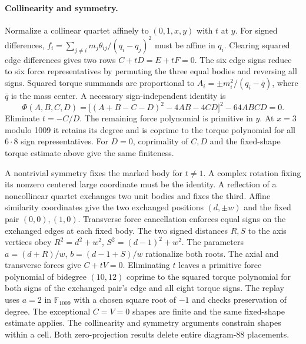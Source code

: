 \documentclass[11pt]{article}
\newcommand{\F}{\mathbb F}
\begin{document}
\paragraph{Collinearity and symmetry.}
Normalize a collinear quartet affinely to $(0,1,x,y)$ with $t$ at $y$. For signed differences, $f_i=\sum_{j\ne i}m_j\theta_{ij}/(q_i-q_j)^2$ must be affine in $q_i$. Clearing squared edge differences gives two rows $C+tD=E+tF=0$. The six edge signs reduce to six force representatives by permuting the three equal bodies and reversing all signs. Squared torque summands are proportional to $A_i=\pm m_i^2/(q_i-\bar q)$, where $\bar q$ is the mass center. A necessary sign-independent identity is
\[
 \Phi(A,B,C,D)=\big[(A+B-C-D)^2-4AB-4CD\big]^2-64ABCD=0.
\]
Eliminate $t=-C/D$. The remaining force polynomial is primitive in $y$. At $x=3$ modulo 1009 it retains its degree and is coprime to the torque polynomial for all $6\cdot8$ sign representatives. For $D=0$, coprimality of $C,D$ and the fixed-shape torque estimate above give the same finiteness.

A nontrivial symmetry fixes the marked body for $t\ne1$. A complex rotation fixing its nonzero centered large coordinate must be the identity. A reflection of a noncollinear quartet exchanges two unit bodies and fixes the third. Affine similarity coordinates give the two exchanged positions $(d,\pm w)$ and the fixed pair $(0,0),(1,0)$. Transverse force cancellation enforces equal signs on the exchanged edges at each fixed body. The two signed distances $R,S$ to the axis vertices obey $R^2=d^2+w^2$, $S^2=(d-1)^2+w^2$. The parameters $a=(d+R)/w$, $b=(d-1+S)/w$ rationalize both roots. The axial and transverse forces give $C+tV=0$. Eliminating $t$ leaves a primitive force polynomial of bidegree $(10,12)$ coprime to the squared torque polynomial for both signs of the exchanged pair's edge and all eight torque signs. The replay uses $a=2$ in $\F_{1009}$ with a chosen square root of $-1$ and checks preservation of degree. The exceptional $C=V=0$ shapes are finite and the same fixed-shape estimate applies. The collinearity and symmetry arguments constrain shapes within a cell. Both zero-projection results delete entire diagram-88 placements.
\end{document}
